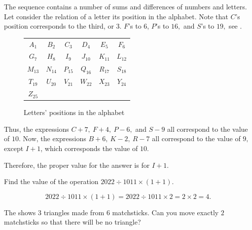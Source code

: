 \documentclass{article}
\begin{document}
\begin{soln} 
    The sequence contains a number of sums and differences of numbers and letters.
    Let consider the relation of a letter its position in the alphabet.
    Note that $C$'s position corresponds to the third, or $3$.
    $F$'s to $6$, $P$'s to $16,$ and $S$'s to $19,$ see .
    
    \begin{figure}[h]
        \centering
        \begin{minipage}[t]{6.5cm}
            \begin{tabular}{cccccc}
                $A_1$ & $B_2$ & $C_3$ & $D_4$ & $E_5$ & $F_6$ \\
                $G_7$ & $H_8$ & $I_9$ & $J_{10}$ & $K_{11}$ & $L_{12}$ \\
                $M_{13}$ & $N_{14}$ & $P_{15}$ & $Q_{16}$ & $R_{17}$ & $S_{18}$ \\
                $T_{19}$ & $U_{20}$ & $V_{21}$ & $W_{22}$ & $X_{23}$ & $Y_{24}$ \\
                $Z_{25}$ &  &  &  &  & 
            \end{tabular}
            \caption{Letters' positions in the alphabet}
            \label{fig:pi-2022-3-p4}
        \end{minipage}
    \end{figure}
    
    Thus, the expressions $C+7,\ F+4,\ P-6,$ and $S-9$ all correspond to the value of $10.$
    Now, the expressions $B+6,\ K-2,\ R-7$ all correspond to the value of $9,$
    except $I+1$, which corresponds the value of $10.$
    
    Therefore, the proper value for the answer is  for $I+1.$ 
\end{soln}

\begin{example*}[Problem 5]
    \label{example:pi-2022-3-p5}
    Find the value of the operation $2022 \div 1011 \times (1+1).$
\end{example*}

\begin{soln} 
    \[
        2022 \div 1011 \times (1+1) = 2022 \div 1011 \times 2 = 2 \times 2 = 4.
    \]
\end{soln}

\newpage

\begin{example*}[Problem 6]
    \label{example:pi-2022-3-p6}
    The  shows $3$ triangles made from $6$ matchsticks.
    Can you move exactly $2$ matchsticks so that there will be no triangle?
\end{example*}
\end{document}
